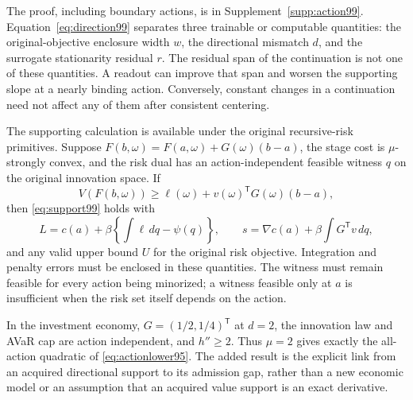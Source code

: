 The proof, including boundary actions, is in Supplement~\ref{supp:action99}. Equation~\eqref{eq:direction99} separates three trainable or computable quantities: the original-objective enclosure width $w$, the directional mismatch $d$, and the surrogate stationarity residual $r$. The residual span of the continuation is not one of these quantities. A readout can improve that span and worsen the supporting slope at a nearly binding action. Conversely, constant changes in a continuation need not affect any of them after consistent centering.

The supporting calculation is available under the original recursive-risk primitives. Suppose $F(b,\omega)=F(a,\omega)+G(\omega)(b-a)$, the stage cost is $\mu$-strongly convex, and the risk dual has an action-independent feasible witness $q$ on the original innovation space. If
\[
 V(F(b,\omega))\ge \ell(\omega)+v(\omega)^{\mathsf T}G(\omega)(b-a),
\]
then \eqref{eq:support99} holds with
\begin{equation}\label{eq:lift99}
 L=c(a)+\beta\left\{\int\ell\,dq-\psi(q)\right\},\qquad
 s=\nabla c(a)+\beta\int G^{\mathsf T}v\,dq,
\end{equation}
and any valid upper bound $U$ for the original risk objective. Integration and penalty errors must be enclosed in these quantities. The witness must remain feasible for every action being minorized; a witness feasible only at $a$ is insufficient when the risk set itself depends on the action.

In the investment economy, $G=(1/2,1/4)^{\mathsf T}$ at $d=2$, the innovation law and AVaR cap are action independent, and $h''\ge2$. Thus $\mu=2$ gives exactly the all-action quadratic of \eqref{eq:actionlower95}. The added result is the explicit link from an acquired directional support to its admission gap, rather than a new economic model or an assumption that an acquired value support is an exact derivative.

